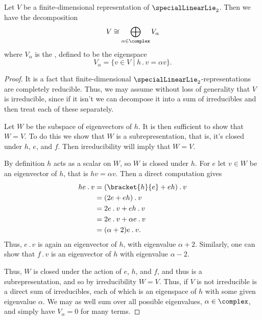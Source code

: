 \documentclass[fleqn]{NotesClass}
\newcommand{\action}{\mathbin{.}}
\newcommand{\isomorphic}{\cong}
\begin{document}
    \begin{lma}{}{}
        Let \(V\) be a finite-dimensional representation of \(\specialLinearLie_2\).
        Then we have the decomposition
        \begin{equation}
            V \isomorphic \bigoplus_{\alpha \in \complex} V_\alpha
        \end{equation}
        where \(V_\alpha\) is the , defined to be the eigenspace
        \begin{equation}
            V_\alpha = \{v \in V \mid h \action v = \alpha v\}.
        \end{equation}
        \begin{proof}
            It is a fact that finite-dimensional \(\specialLinearLie_2\)-representations are completely reducible.
            Thus, we may assume without loss of generality that \(V\) is irreducible, since if it isn't we can decompose it into a sum of irreducibles and then treat each of these separately.
            
            Let \(W\) be the subspace of eigenvectors of \(h\).
            It is then sufficient to show that \(W = V\).
            To do this we show that \(W\) is a subrepresentation, that is, it's closed under \(h\), \(e\), and \(f\).
            Then irreducibility will imply that \(W = V\).
            
            By definition \(h\) acts as a scalar on \(W\), so \(W\) is closed under \(h\).
            For \(e\) let \(v \in W\) be an eigenvector of \(h\), that is \(hv = \alpha v\).
            Then a direct computation gives
            \begin{align}
                he \action v &= (\bracket{h}{e} + eh) \action v\\
                &= (2e + eh) \action v\\
                &= 2e \action v + eh \action v\\
                &= 2e \action v + \alpha e\action v\\
                &= (\alpha + 2) e \action v.
            \end{align}
            Thus, \(e \action v\) is again an eigenvector of \(h\), with eigenvalue \(\alpha + 2\).
            Similarly, one can show that \(f \action v\) is an eigenvector of \(h\) with eigenvalue \(\alpha - 2\).
            
            Thus, \(W\) is closed under the action of \(e\), \(h\), and \(f\), and thus is a subrepresentation, and so by irreducibility \(W = V\).
            Thus, if \(V\) is not irreducible is a direct sum of irreducibles, each of which is an eigenspace of \(h\) with some given eigenvalue \(\alpha\).
            We may as well sum over all possible eigenvalues, \(\alpha \in \complex\), and simply have \(V_\alpha = 0\) for many terms.
        \end{proof}
    \end{lma}
    
\end{document}
